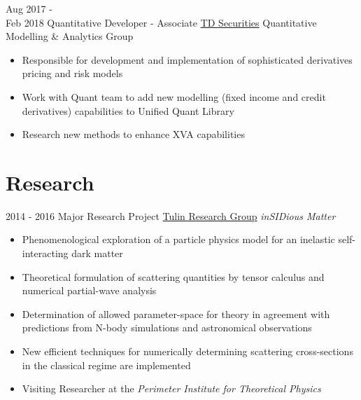 \documentclass[letterpaper]{twentysecondcv} %
\begin{document}
\begin{twenty}
	\twentyitem
    	{Aug 2017 - \\ Feb 2018}
        {Quantitative Developer - Associate}
        {\href{https://www.tdsecurities.com}{TD Securities}}
        {Quantitative Modelling \& Analytics Group}
        {
        {\begin{itemize}
        \item Responsible for development and implementation of sophisticated derivatives pricing and risk models
        \item Work with Quant team to add new modelling (fixed income and credit derivatives) capabilities to Unified Quant Library  
        \item Research new methods to enhance XVA capabilities
    \end{itemize}}
        }
\end{twenty}


\vfill


\section{Research}
\begin{twenty}
	\twentyitem
    	{2014 - 2016}
        {Major Research Project}
        {\href{http://www.yorku.ca/stulin/research.html}{Tulin Research Group}}
        {\emph{inSIDious Matter}}
        {
        {\begin{itemize}
        \item Phenomenological exploration of a particle physics model for an inelastic self-interacting dark matter 
        \item Theoretical formulation of scattering quantities by tensor calculus and numerical partial-wave analysis
        \item Determination of allowed parameter-space for theory in agreement with predictions from N-body simulations and astronomical observations
       	\item New efficient techniques for numerically determining scattering cross-sections in the classical regime are implemented
    	\item Visiting Researcher at the \emph{Perimeter Institute for Theoretical Physics}
    \end{itemize}}

        }
\end{twenty}

\vfill

\end{document}
